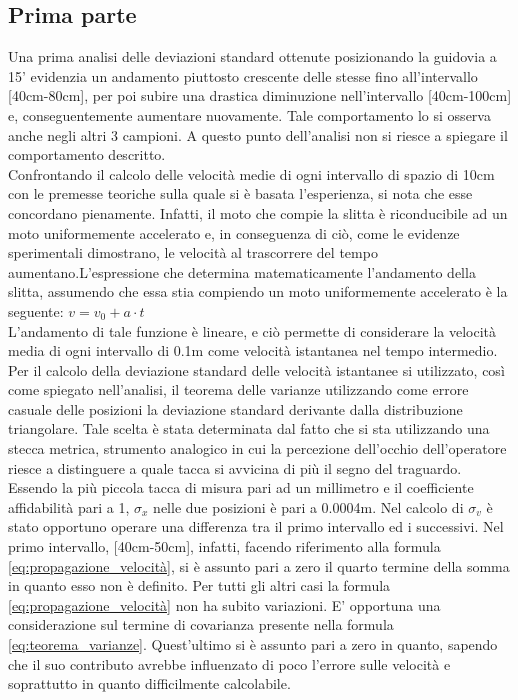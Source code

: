 \documentclass[a4paper,11pt,oneside]{article}
\begin{document}
\subsection{Prima parte}
Una prima analisi delle deviazioni standard ottenute posizionando la guidovia a 15' evidenzia un andamento piuttosto crescente delle stesse fino all'intervallo [40cm-80cm], per poi subire una drastica diminuzione nell'intervallo [40cm-100cm] e, conseguentemente aumentare nuovamente. Tale comportamento lo si osserva anche negli altri 3 campioni. A questo punto dell'analisi non si riesce a spiegare il comportamento descritto.\\
Confrontando il calcolo delle velocità medie di ogni intervallo di spazio di 10cm con le premesse teoriche sulla quale si è basata l'esperienza, si nota che esse concordano pienamente. Infatti, il moto che compie la slitta è riconducibile ad un moto uniformemente accelerato e, in conseguenza di ciò, come le evidenze sperimentali dimostrano, le velocità al trascorrere del tempo aumentano.L'espressione che determina matematicamente l'andamento della slitta, assumendo che essa stia compiendo un moto uniformemente accelerato è la seguente: $v=v_{0}+a\cdot t$\\
L'andamento di tale funzione è lineare, e ciò permette di considerare la velocità media di ogni intervallo di 0.1m come velocità istantanea nel tempo intermedio.
Per il calcolo della deviazione standard delle velocità istantanee si utilizzato, così come spiegato nell'analisi, il teorema delle varianze utilizzando come errore casuale delle posizioni la deviazione standard derivante dalla distribuzione triangolare. Tale scelta è stata determinata dal fatto che si sta utilizzando una stecca metrica, strumento analogico in cui la percezione dell'occhio dell'operatore riesce a distinguere a quale tacca si avvicina di più il segno del traguardo. Essendo la più piccola tacca di misura pari ad un millimetro e il coefficiente affidabilità pari a 1, $\sigma_x$ nelle due posizioni è pari a 0.0004m.
Nel calcolo di $\sigma_v$ è stato opportuno operare una differenza tra il primo intervallo ed i successivi. Nel primo intervallo, [40cm-50cm], infatti, facendo riferimento alla formula \ref{eq:propagazione_velocità}, si è assunto pari a zero il quarto termine della somma in quanto esso non è definito. Per tutti gli altri casi la formula \ref{eq:propagazione_velocità} non ha subito variazioni.
E' opportuna una considerazione sul termine di covarianza presente nella formula \ref{eq:teorema_varianze}.
Quest'ultimo si è assunto pari a zero in quanto, sapendo che il suo contributo avrebbe influenzato di poco l'errore sulle velocità e soprattutto in quanto difficilmente calcolabile.
\end{document}
